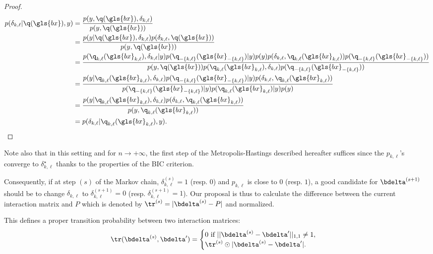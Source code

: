 \begin{proof}
\begin{align*}
p(\delta_{k,\ell} | \q(\gls{bx}),y) & = \frac{p(y , \q(\gls{bx}), \delta_{k,\ell})}{p(y , \q(\gls{bx}))} \\
 & = \frac{p(y | \q(\gls{bx}),\delta_{k,\ell}) p(\delta_{k,\ell}, \q(\gls{bx}))}{p(y,\q(\gls{bx}))} \\
 & = \frac{p(\q_{k,\ell}(\gls{bx}_{k,\ell}),\delta_{k,\ell} | y) p(\q_{-\{k,\ell\}}(\gls{bx}_{-\{k,\ell\}}) | y) p(y) p(\delta_{k,\ell},\q_{k,\ell}(\gls{bx}_{k,\ell})) p(\q_{-\{k,\ell\}}(\gls{bx}_{-\{k,\ell\}})) }{p(y,\q(\gls{bx})) p(\q_{k,\ell}(\gls{bx}_{k,\ell}),\delta_{k,\ell}) p(\q_{-\{k,\ell\}}(\gls{bx}_{-\{k,\ell\}}))} \\
 & = \frac{p(y | \q_{k,\ell}(\gls{bx}_{k,\ell}),\delta_{k,\ell}) p(\q_{-\{k,\ell\}}(\gls{bx}_{-\{k,\ell\}}) | y) p(\delta_{k,\ell},\q_{k,\ell}(\gls{bx}_{k,\ell}))}{p(\q_{-\{k,\ell\}}(\gls{bx}_{-\{k,\ell\}}) | y) p(\q_{k,\ell}(\gls{bx}_{k,\ell}) | y) p(y) } \\
 & = \frac{p(y | \q_{k,\ell}(\gls{bx}_{k,\ell}),\delta_{k,\ell}) p(\delta_{k,\ell},\q_{k,\ell}(\gls{bx}_{k,\ell}))}{p(y , \q_{k,\ell}(\gls{bx}_{k,\ell}))} \\
 & = p(\delta_{k,\ell} | \q_{k,\ell}(\gls{bx}_{k,\ell}), y).
\end{align*}
\end{proof}
Note also that in this setting and for $n \to +\infty$, the first step of the Metropolis-Hastings described hereafter suffices since the $p_{k,\ell}$'s converge to $\delta_{k,\ell}^\star$ thanks to the properties of the BIC criterion.

Consequently, if at step $(s)$ of the Markov chain, $\delta_{k,\ell}^{(s)} = 1$ (resp. $0$) and $p_{k,\ell}$ is close to $0$ (resp. $1$), a good candidate for $\bdelta^{(s+1)}$ should be to change $\delta_{k,\ell}$ to $\delta_{k,\ell}^{(s+1)} = 0$ (resp. $\delta_{k,\ell}^{(s+1)} = 1$). Our proposal is thus to calculate the difference between the current interaction matrix and $P$ which is denoted by $\tr^{(s)} = |\bdelta^{(s)} - P|$ and normalized.

This defines a proper transition probability between two interaction matrices:
\[ \tr(\bdelta^{(s)},\bdelta') = \begin{cases} 0 \text{ if } ||\bdelta^{(s)} - \bdelta'||_{1,1} \neq 1, \\ \tr^{(s)} \odot |\bdelta^{(s)} - \bdelta'|. \end{cases} \]

